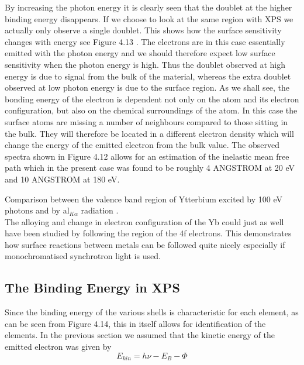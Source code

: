              By increasing the photon energy it is clearly seen that
          the doublet at the higher binding energy disappears. If we
          choose to look at the same region with XPS we actually only
          observe a single doublet. This shows how the surface
          sensitivity changes with energy see Figure 4.13 \cite{gerken}. The
          electrons are in this case essentially emitted with the
          photon energy and we should therefore expect low surface
          sensitivity when the photon energy is high. Thus the doublet
          observed at high energy is due to signal from the bulk of
          the material, whereas the extra doublet observed at low
          photon energy is due to the surface region. As we shall see,
          the bonding energy of the electron is dependent not only  on
          the atom and its electron configuration,  but  also  on  the
          chemical surroundings of the atom. In this case the  surface
          atoms are missing a number of neighbours compared  to  those
          sitting in the bulk. They will  therefore  be  located  in  a
          different electron density which will change the  energy  of
          the emitted electron  from  the  bulk  value.  The  observed
          spectra shown in Figure 4.12 allows for an estimation of  the
          inelastic mean free path which in the present case was found
          to be roughly 4 ANGSTROM at 20 eV and 10 ANGSTROM at 180 eV.

\vspace*{12cm}

              Comparison between the
          valence band region of Ytterbium excited by 100 eV photons
          and by al$_{K\alpha}$ radiation \cite{gerken}.\\

             The alloying and change in electron configuration of the
          Yb could just as well have been studied by following the
          region of the 4f electrons. This demonstrates how surface
          reactions between metals can be followed quite nicely
          especially if monochromatised synchrotron light is used.




             \subsection{The Binding Energy in XPS}




          Since the binding energy of the various shells is
          characteristic for each element, as can be seen from Figure
          4.14, this in itself allows for identification of the elements. In
          the previous section we assumed that the kinetic energy of
          the emitted electron was given by \begin{equation}
          E_{kin}=h\nu-E_{B}-\Phi \end{equation}

